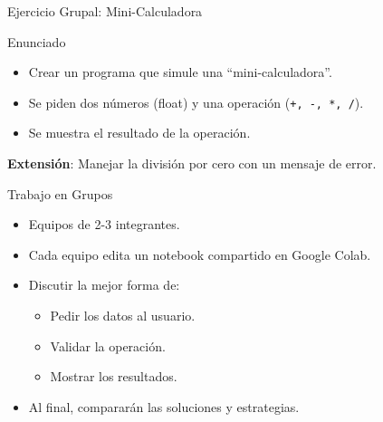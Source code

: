\documentclass[10pt]{beamer}
\begin{document}
\begin{frame}{Ejercicio Grupal: Mini-Calculadora}
  \begin{block}{Enunciado}
    \begin{itemize}
      \item Crear un programa que simule una “mini-calculadora”.
      \item Se piden dos números (float) y una operación (\texttt{+, -, *, /}).
      \item Se muestra el resultado de la operación.
    \end{itemize}
  \end{block}
  \textbf{Extensión}: Manejar la división por cero con un mensaje de error.
\end{frame}

\begin{frame}{Trabajo en Grupos}
  \begin{itemize}
    \item Equipos de 2-3 integrantes.
    \item Cada equipo edita un notebook compartido en Google Colab.
    \item Discutir la mejor forma de:
      \begin{itemize}
        \item Pedir los datos al usuario.
        \item Validar la operación.
        \item Mostrar los resultados.
      \end{itemize}
    \item Al final, compararán las soluciones y estrategias.
  \end{itemize}
\end{frame}
\end{document}
